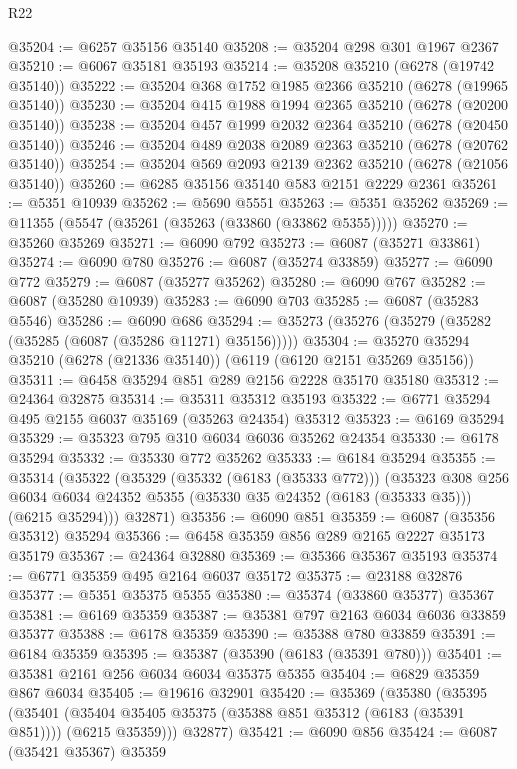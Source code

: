 \begin{lexlean}{R22}
\begin{coremodule}
@35204 := @6257 @35156 @35140
@35208 := @35204 @298 @301 @1967 @2367
@35210 := @6067 @35181 @35193
@35214 := @35208 @35210 (@6278 (@19742 @35140))
@35222 := @35204 @368 @1752 @1985 @2366 @35210 (@6278 (@19965 @35140))
@35230 := @35204 @415 @1988 @1994 @2365 @35210 (@6278 (@20200 @35140))
@35238 := @35204 @457 @1999 @2032 @2364 @35210 (@6278 (@20450 @35140))
@35246 := @35204 @489 @2038 @2089 @2363 @35210 (@6278 (@20762 @35140))
@35254 := @35204 @569 @2093 @2139 @2362 @35210 (@6278 (@21056 @35140))
@35260 := @6285 @35156 @35140 @583 @2151 @2229 @2361
@35261 := @5351 @10939
@35262 := @5690 @5551
@35263 := @5351 @35262
@35269 := @11355 (@5547 (@35261 (@35263 (@33860 (@33862 @5355)))))
@35270 := @35260 @35269
@35271 := @6090 @792
@35273 := @6087 (@35271 @33861)
@35274 := @6090 @780
@35276 := @6087 (@35274 @33859)
@35277 := @6090 @772
@35279 := @6087 (@35277 @35262)
@35280 := @6090 @767
@35282 := @6087 (@35280 @10939)
@35283 := @6090 @703
@35285 := @6087 (@35283 @5546)
@35286 := @6090 @686
@35294 := @35273 (@35276 (@35279 (@35282 (@35285 (@6087 (@35286 @11271) @35156)))))
@35304 := @35270 @35294 @35210 (@6278 (@21336 @35140)) (@6119 (@6120 @2151 @35269 @35156))
@35311 := @6458 @35294 @851 @289 @2156 @2228 @35170 @35180
@35312 := @24364 @32875
@35314 := @35311 @35312 @35193
@35322 := @6771 @35294 @495 @2155 @6037 @35169 (@35263 @24354) @35312
@35323 := @6169 @35294
@35329 := @35323 @795 @310 @6034 @6036 @35262 @24354
@35330 := @6178 @35294
@35332 := @35330 @772 @35262
@35333 := @6184 @35294
@35355 := @35314
    (@35322
      (@35329
        (@35332 (@6183 (@35333 @772)))
        (@35323
          @308
          @256
          @6034
          @6034
          @24352
          @5355
          (@35330 @35 @24352 (@6183 (@35333 @35)))
          (@6215 @35294)))
      @32871)
@35356 := @6090 @851
@35359 := @6087 (@35356 @35312) @35294
@35366 := @6458 @35359 @856 @289 @2165 @2227 @35173 @35179
@35367 := @24364 @32880
@35369 := @35366 @35367 @35193
@35374 := @6771 @35359 @495 @2164 @6037 @35172
@35375 := @23188 @32876
@35377 := @5351 @35375 @5355
@35380 := @35374 (@33860 @35377) @35367
@35381 := @6169 @35359
@35387 := @35381 @797 @2163 @6034 @6036 @33859 @35377
@35388 := @6178 @35359
@35390 := @35388 @780 @33859
@35391 := @6184 @35359
@35395 := @35387 (@35390 (@6183 (@35391 @780)))
@35401 := @35381 @2161 @256 @6034 @6034 @35375 @5355
@35404 := @6829 @35359 @867 @6034
@35405 := @19616 @32901
@35420 := @35369
    (@35380
      (@35395
        (@35401 (@35404 @35405 @35375 (@35388 @851 @35312 (@6183 (@35391 @851)))) (@6215 @35359)))
      @32877)
@35421 := @6090 @856
@35424 := @6087 (@35421 @35367) @35359

\end{coremodule}
\end{lexlean}
